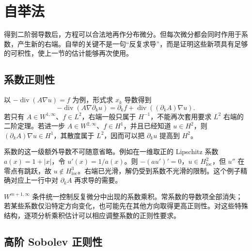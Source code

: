 \section{自举法}
\label{b2:sec:1602}

得到二阶弱导数后，方程可以合法地再作分布微分。但每次微分都会同时作用于系数，产生新的右端。自举的关键不是一句“反复求导”，而是证明这些新项具有足够的可积性，使上一节的估计能够再次使用。

\subsection{系数正则性}
\label{b2:subsec:160201}

以 \(-\operatorname{div}(A\nabla u)=f\) 为例，形式求 \(x_k\) 导数得到
\[
 -\operatorname{div}(A\nabla\partial_ku)
 =\partial_kf+\operatorname{div}((\partial_kA)\nabla u).
\]
若只有 \(A\in W^{1,\infty}\)、\(f\in L^2\)，右端一般只属于 \(H^{-1}\)，不能再次套用要求 \(L^2\) 右端的二阶定理。若进一步 \(A\in W^{2,\infty}\)、\(f\in H^1\)，并且已经知道 \(u\in H^2\)，则 \((\partial_kA)\nabla u\in H^1\)，其散度属于 \(L^2\)，因而可以把 \(\partial_ku\) 提高到 \(H^2\)。

\ProseParagraphBreak

系数的这一级额外导数不可随意省略。例如在一维取正的 Lipschitz 系数 \(a(x)=1+|x|\)，令 \(u'(x)=1/a(x)\)。则 \(-(au')'=0\)，\(u\in H_{\mathrm{loc}}^2\)，但 \(u''\) 在零点有跳跃，故 \(u\notin H_{\mathrm{loc}}^3\)。右端已光滑，解仍受到系数不光滑的限制。这个例子精确对应上一行中对 \(\partial_kA\) 再求导的需要。

\ProseParagraphBreak

\(W^{m+1,\infty}\) 条件统一控制反复微分中出现的系数乘积。常系数的导数项全部消失；若某些系数仅沿特定方向变化，也可能先在其他方向取得更高正则性。对这些特殊结构，逐项分析乘积估计可以相应调整系数的正则性要求。

\subsection{高阶 Sobolev 正则性}
\label{b2:subsec:160202}

